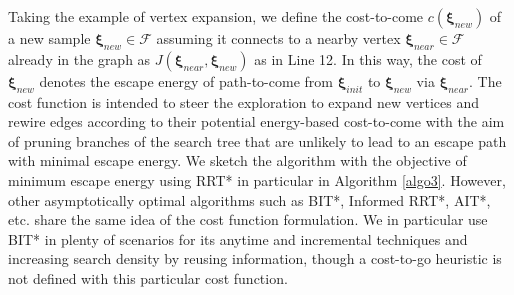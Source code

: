 \documentclass[conference]{IEEEtran}
\newcommand{\bxi}{\boldsymbol{\xi}}
\begin{document}
Taking the example of vertex expansion, we define the cost-to-come $c(\boldsymbol{\xi}_{new})$ of a new sample $\boldsymbol{\xi}_{new} \in \mathcal{F}$ assuming it connects to a nearby vertex $\boldsymbol{\xi}_{near} \in \mathcal{F}$ already in the graph as $J(\bxi_{near}, \bxi_{new})$ as in Line 12.
In this way, the cost of $\boldsymbol{\xi}_{new}$ denotes the escape energy of path-to-come from $\bxi_{init}$ to $\boldsymbol{\xi}_{new}$ via $\boldsymbol{\xi}_{near}$.
The cost function is intended to steer the exploration to expand new vertices and rewire edges according to their potential energy-based cost-to-come with the aim of pruning branches of the search tree that are unlikely to lead to an escape path with minimal escape energy.
We sketch the algorithm with the objective of minimum escape energy using RRT* \cite{sampling1} in particular in Algorithm \ref{algo3}. 
However, other asymptotically optimal algorithms such as BIT*, Informed RRT*, AIT*, etc. share the same idea of the cost function formulation.
We in particular use BIT* in plenty of scenarios for its anytime and incremental techniques and increasing search density by reusing information, though a cost-to-go heuristic is not defined with this particular cost function.
\end{document}
